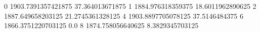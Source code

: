 0 1903.7391357421875 37.364013671875
1 1884.976318359375 18.6011962890625
2 1887.649658203125 21.2745361328125
4 1903.8897705078125 37.5146484375
6 1866.3751220703125 0.0
8 1874.758056640625 8.3829345703125
